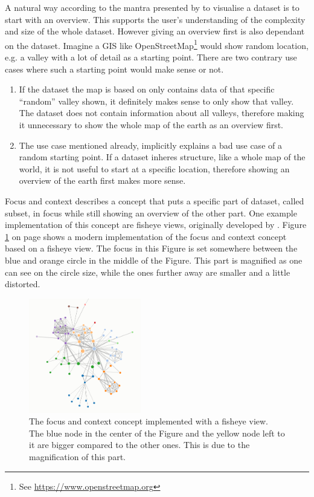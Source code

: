 A natural way according to the mantra presented by \citeauthor{Shneiderman1996} to visualise a dataset is to start with an overview. This supports the user's understanding of the complexity and size of the whole dataset. However giving an overview first is also dependant on the dataset. Imagine a \ac{GIS} like OpenStreetMap\footnote{See \href{https://www.openstreetmap.org}{https://www.openstreetmap.org}} would show random location, e.g. a valley with a lot of detail as a starting point. There are two contrary use cases where such a starting point would make sense or not.
\begin{enumerate}
\item If the dataset the map is based on only contains data of that specific ``random'' valley shown, it definitely makes sense to only show that valley. The dataset does not contain information about all valleys, therefore making it unnecessary to show the whole map of the earth as an overview first.
\item The use case mentioned already, implicitly explains a bad use case of a random starting point. If a dataset inheres structure, like a whole map of the world, it is not useful to start at a specific location, therefore showing an overview of the earth first makes more sense.
\end{enumerate}

Focus and context describes a concept that puts a specific part of dataset, called subset, in focus while still showing an overview of the other part. One example implementation of this concept are fisheye views, originally developed by \citeauthor{Furnas:1986} . Figure \ref{fig:focus} on page \pageref{fig:focus} shows a modern implementation of the focus and context concept based on a fisheye view. The focus in this Figure is set somewhere between the blue and orange circle in the middle of the Figure. This part is magnified as one can see on the circle size, while the ones further away are smaller and a little distorted.

\begin{figure}[!htb]
\centering
\includegraphics[height=5cm,keepaspectratio]{images/methods/interaction/focus.png}
\caption[
    The focus and context concept based implemented with a fisheye view, Urldate: 07.2016 \newline
    \small\texttt{\url{https://bost.ocks.org/mike/fisheye/}}.
]{The focus and context concept implemented with a fisheye view. The blue node in the center of the Figure and the yellow node left to it are bigger compared to the other ones. This is due to the magnification of this part.}
\label{fig:focus}
\end{figure}

